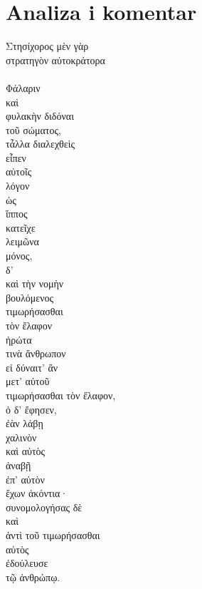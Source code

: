 \section*{Analiza i komentar}


{\large
\begin{greek}
\noindent Στησίχορος μὲν γὰρ \\
\tabto{2em}  στρατηγὸν αὐτοκράτορα \\
\tabto{2em}  \\
\tabto{3em} Φάλαριν \\
\tabto{2em} καὶ  \\
\tabto{4em} φυλακὴν διδόναι \\
\tabto{6em} τοῦ σώματος, \\
τἆλλα διαλεχθεὶς \\
εἶπεν \\
αὐτοῖς \\
λόγον \\
\tabto{2em} ὡς \\
\tabto{2em} ἵππος \\
\tabto{4em} κατεῖχε \\
\tabto{4em} λειμῶνα \\
\tabto{2em} μόνος, \\
\tabto{2em}  δ'  \\
\tabto{2em} καὶ  τὴν νομὴν \\
\tabto{2em} βουλόμενος \\
\tabto{4em} τιμωρήσασθαι \\
\tabto{6em} τὸν ἔλαφον \\
\tabto{2em} ἠρώτα \\
\tabto{2em} τινὰ ἄνθρωπον \\
\tabto{4em} εἰ δύναιτ' ἂν \\
\tabto{6em} μετ' αὐτοῦ \\
\tabto{6em} τιμωρήσασθαι τὸν ἔλαφον, \\
\tabto{2em} ὁ δ' ἔφησεν, \\
\tabto{4em} ἐὰν λάβῃ \\
\tabto{6em} χαλινὸν \\
\tabto{4em} καὶ αὐτὸς \\
\tabto{4em} ἀναβῇ \\
\tabto{6em} ἐπ' αὐτὸν \\
\tabto{4em} ἔχων ἀκόντια· \\
\tabto{2em} συνομολογήσας δὲ \\
\tabto{4em} καὶ  \\
\tabto{2em} \tabto{2em} ἀντὶ τοῦ τιμωρήσασθαι \\
\tabto{2em} \tabto{2em} αὐτὸς \\
\tabto{2em} ἐδούλευσε \\
\tabto{4em} τῷ ἀνθρώπῳ. \\

\end{greek}
}

